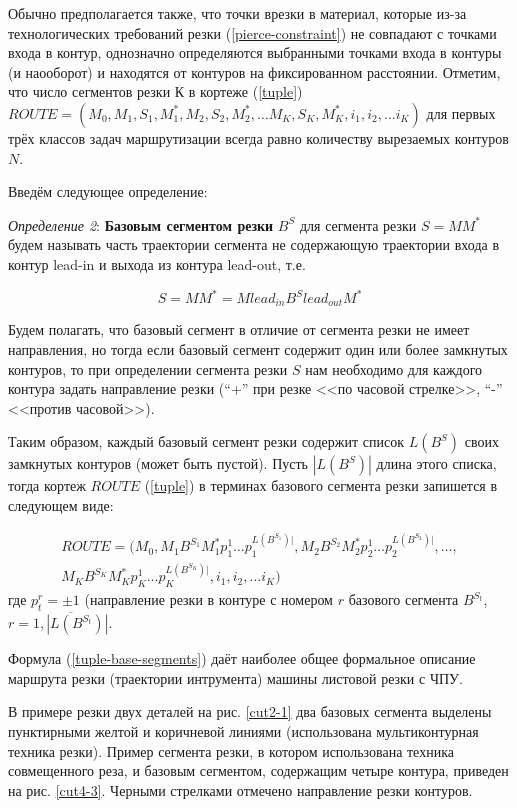 \documentclass[11pt,twoside]{report}
\begin{document}
Обычно предполагается также,
что точки врезки в материал,
которые из-за технологических требований резки
(\ref{pierce-constraint})
не совпадают с точками входа в контур,
однозначно определяются выбранными точками входа в контуры (и наооборот)
и находятся от контуров на фиксированном расстоянии.
Отметим, что число сегментов резки К в кортеже (\ref{tuple})
$ROUTE = (
  M_0, M_1, S_1, M_1^*, M_2, S_2, M_2^*, \dots M_K, S_K, M_K^*, i_1, i_2, \dots i_K
)$
для первых трёх классов задач маршрутизации всегда равно количеству вырезаемых контуров $N$.

Введём следующее определение:



{\it Определение 2}:
{\bf Базовым сегментом резки}
$B^S$
для сегмента резки
$S=MM^*$
будем называть часть траектории сегмента
не содержающую траектории входа в контур
lead-in и выхода из контура lead-out, т.е.

\begin{equation}
S=MM^* = M lead_{in} B^S lead_{out} M^*
\label{base-segment}
\end{equation}

Будем полагать,
что базовый сегмент в отличие от сегмента резки
не имеет направления,
но тогда если базовый сегмент содержит
один или более замкнутых контуров,
то при определении сегмента резки $S$
нам необходимо для каждого контура задать направление резки
(“+” при резке <<по часовой стрелке>>, “-” <<против часовой>>).

Таким образом,
каждый базовый сегмент резки
содержит список
$L(B^S)$
своих замкнутых контуров (может быть пустой).
Пусть
$|L(B^S)|$
длина этого списка, тогда кортеж $ROUTE$ (\ref{tuple})
в терминах базового сегмента резки запишется в следующем виде:

\begin{multline}
  ROUTE = (
    M_0, M_1 B^{S_1} M_1^* p_1^1 \dots p_1^{L(B^{S_1})|},
    M_2 B^{S_2} M_2^* p_2^1 \dots p_2^{L(B^{S_2})|},
    \dots, \\
    M_K B^{S_K} M_K^* p_K^1 \dots p_K^{L(B^{S_K})|},
    i_1, i_2, \dots i_K
  )
  \label{tuple-base-segments}
\end{multline}
где $p_t^r=\pm 1$
(направление резки в контуре с номером $r$ базового сегмента  $B^{S_t}$,
$r=\overline{1, |L(B^{S_t})|}$.

Формула (\ref{tuple-base-segments})
даёт наиболее общее формальное описание маршрута резки (траектории интрумента)
машины листовой резки с ЧПУ.

В примере резки двух деталей
на рис. \ref{cut2-1}
два базовых сегмента выделены пунктирными
желтой и коричневой линиями
(использована мультиконтурная техника резки).
Пример сегмента резки, в котором использована техника совмещенного реза,
и  базовым сегментом, содержащим четыре контура,
приведен на рис. \ref{cut4-3}.
Черными стрелками отмечено направление резки контуров.
\end{document}
